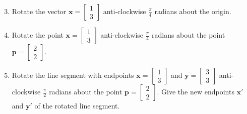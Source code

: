 \documentclass[11pt,a4paper,titlepage,oneside,openany]{article}
\numberwithin{equation}{section}
\numberwithin{algorithm}{section}
\numberwithin{figure}{section}
\numberwithin{table}{section}
\renewcommand{\vec}[1]{\mathbf{#1}}
\begin{document}
\begin{enumerate}
\setcounter{enumi}{2}
\item
  Rotate the vector $\vec{x}=\left[ \begin{array}{c} 1 \\ 3 \end{array}\right]$ anti-clockwise $\frac{\pi}{4}$ radians about the origin.
\item
  Rotate the point $\vec{x}=\left[ \begin{array}{c} 1 \\ 3 \end{array}\right]$ anti-clockwise $\frac{\pi}{4}$ radians about the point $\vec{p}=\left[ \begin{array}{c} 2 \\ 2 \end{array}\right]$.
\item
  Rotate the line segment with endpoints $\vec{x}=\left[ \begin{array}{c} 1 \\ 3 \end{array}\right]$ and $\vec{y}=\left[ \begin{array}{c} 3 \\ 3 \end{array}\right]$ anti-clockwise $\frac{\pi}{2}$ radians about the point $\vec{p}=\left[ \begin{array}{c} 2 \\ 2 \end{array}\right]$. Give the new endpoints $\vec{x}'$ and $\vec{y}'$ of the rotated line segment.
\end{enumerate}
\end{document}

